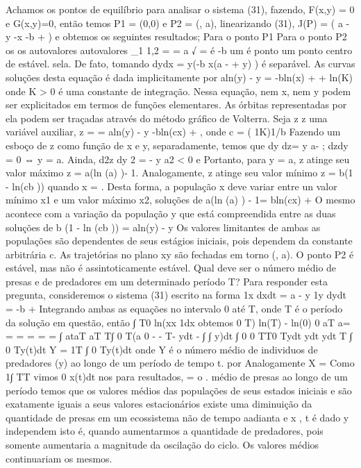 {{{{{{{{{{{{{{{{{{{Achamos os pontos de equilíbrio para analisar o sistema (31), fazendo, F(x,y) = 0 e 
G(x,y)=0, então temos P1 = (0,0) e P2 = 
(\betab, \alpha a), linearizando (31), 
J(P) = 
( a - \alpha y -\alpha x 
\betay -b + \betax 
) 
e obtemos os seguintes resultados; 
Para o ponto P1 Para o ponto P2 os os autovalores autovalores \lambda\lambda_{1} 1,2 = = a \pme √ = é -b um é ponto um ponto centro de estável. 
sela. 
De fato, tomando 
dydx = y(-b x(a - + \alpha y) 
\betax) é separável. As curvas soluções desta equação é dada implicitamente por aln(y) - \alpha y = -bln(x) + \betax + ln(K) onde K > 0 é uma constante de integração. 
Nessa equação, nem x, nem y podem ser explicitados em termos de funções elementares. As órbitas representadas por ela podem ser traçadas através do método gráfico de Volterra. 
Seja { z z uma variável auxiliar, z = = aln(y) - \alpha y 
-bln(cx) + \betax , onde c = 
( 1K)1/b Fazendo um esboço de z como função de x e y, separadamente, temos que dy dz= y a- \alpha ; dzdy = 0 ⇔ y = \alpha a. Ainda, d2z 
dy 2 = - y a2 < 0 e Portanto, para y = \alpha a, z atinge seu valor máximo z = a(ln 
(a\alpha ) 
)- 1. Analogamente, z atinge seu valor mínimo z = b(1 - ln(cb\beta 
)) 
quando x = \betab. Desta forma, a população x deve variar entre un valor mínimo x1 e um valor máximo x2, soluções de 
a(ln 
(a\alpha ) 
) - 1= bln(cx) +  
O mesmo acontece com a variação da população y que está compreendida entre as duas soluções de 
b 
(1 - ln 
(cb\beta 
)) 
= aln(y) - \alpha y 
Os valores limitantes de ambas as populações são dependentes de seus estágios iniciais, pois dependem da constante arbitrária c. 
As trajetórias no plano xy são fechadas em torno 
(\betab, \alpha a). O ponto P2 é estável, mas não é assintoticamente estável. 
Qual deve ser o número médio de presas e de predadores em um determinado período T? Para responder esta pregunta, consideremos o sistema (31) escrito na forma 
1x 
dxdt = a - \alpha y 1y 
dydt = -b + \betax Integrando ambas as equações no intervalo 0 até T, onde T é o período da solução em questão, então ∫ T0 ln(xx 1dx obtemos 0 T) ln(T) - ln(0) 0 aT a\alpha  = = = = = = ∫ ataT aT  T∫ 0 T(a 0 - - T- ydt 
- \alpha \alpha \alpha ∫ ∫ \alpha y)dt ∫ 0 0 TT0 Tydt ydt 
ydt 
T 
∫ 0 Ty(t)dt Y = 1T 
∫ 0 Ty(t)dt onde Y é o número médio de individuos de predadores (y) ao longo de um período de tempo t. por Analogamente X = Como 1∫ TT 
vimos 0 x(t)dt nos para resultados, = o  . médio de presas ao longo de um período temos que os valores médios das populações de seus estados iniciais e são exatamente iguais a seus valores estacionários existe uma diminuição da quantidade de presas em um ecossistema não de tempo aadianta \alpha  e x \betabe , t é dado y independem isto é, quando aumentarmos a quantidade de predadores, pois somente aumentaria a magnitude da oscilação do ciclo. Os valores médios continuariam os mesmos. 
}}}}}}}}}}}}}}}}}}}}

